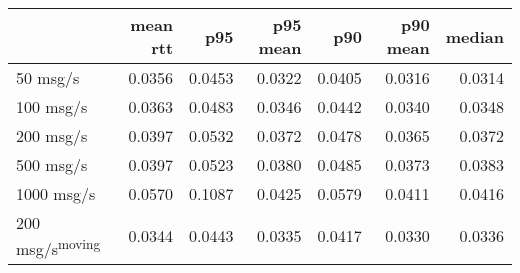 \begin{tabular}{l|rrrrrr}
\rowcolor{gray!50}
 & mean rtt & p95 & p95 mean & p90 & p90 mean & median\\\hline
50 msg/s & 0.0356 & 0.0453 & 0.0322 & 0.0405 & 0.0316 & 0.0314 \\
100 msg/s & 0.0363 & 0.0483 & 0.0346 & 0.0442 & 0.0340 & 0.0348 \\
200 msg/s & 0.0397 & 0.0532 & 0.0372 & 0.0478 & 0.0365 & 0.0372 \\
500 msg/s & 0.0397 & 0.0523 & 0.0380 & 0.0485 & 0.0373 & 0.0383 \\
1000 msg/s & 0.0570 & 0.1087 & 0.0425 & 0.0579 & 0.0411 & 0.0416 \\
200 msg/s\textsuperscript{moving} & 0.0344 & 0.0443 & 0.0335 & 0.0417 & 0.0330 & 0.0336 \\
\end{tabular}
